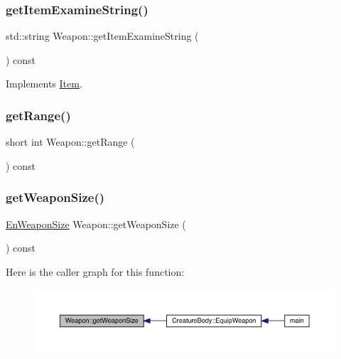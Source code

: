 \mbox{\label{class_weapon_aa52cecf0a3c34aba70a6425c36d40afa}} 
\subsubsection{\texorpdfstring{get\+Item\+Examine\+String()}{getItemExamineString()}}
{\footnotesize\ttfamily std\+::string Weapon\+::get\+Item\+Examine\+String (\begin{DoxyParamCaption}{ }\end{DoxyParamCaption}) const\hspace{0.3cm}{\ttfamily [virtual]}}



Implements \mbox{\hyperlink{class_item_a00e06647e1adeb62f2d95044476126ac}{Item}}.

\mbox{\label{class_weapon_a726f5f0de9244b9e24e52407272cdf08}} 
\subsubsection{\texorpdfstring{get\+Range()}{getRange()}}
{\footnotesize\ttfamily short int Weapon\+::get\+Range (\begin{DoxyParamCaption}{ }\end{DoxyParamCaption}) const}

\mbox{\label{class_weapon_a459fd4ef8f2eefc9be73f05b6ec42bcd}} 
\subsubsection{\texorpdfstring{get\+Weapon\+Size()}{getWeaponSize()}}
{\footnotesize\ttfamily \mbox{\hyperlink{_weapon_8hpp_a160076f6c574c69cd1ce2b3f42cf3755}{En\+Weapon\+Size}} Weapon\+::get\+Weapon\+Size (\begin{DoxyParamCaption}{ }\end{DoxyParamCaption}) const}

Here is the caller graph for this function\+:
\nopagebreak
\begin{figure}[H]
\begin{center}
\leavevmode
\includegraphics[width=350pt]{class_weapon_a459fd4ef8f2eefc9be73f05b6ec42bcd_icgraph}
\end{center}
\end{figure}
\mbox{\label{class_weapon_a99c74249e561d0130575a2278a982a6c}} 
